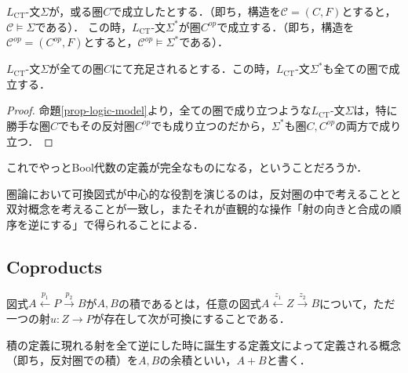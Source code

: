 \documentclass[uplatex, 12pt, dvipdfmx]{jsarticle}
\begin{document}
\begin{proposition*}\label{prop-logic-model}
    $L_{\mathrm{CT}}$-文$\Sigma$が，或る圏$C$で成立したとする．（即ち，構造を$\mathcal{C}=(C,F)$とすると，$\mathcal{C}\models\Sigma$である）．
    この時，$L_{\mathrm{CT}}$-文$\Sigma^*$が圏$C^{op}$で成立する．（即ち，構造を$\mathcal{C}^{op}=(C^{op},F)$とすると，$\mathcal{C}^{op}\models\Sigma^*$である）．
\end{proposition*}

\begin{proposition}\label{prop-duality-conceptual}
    $L_{\mathrm{CT}}$-文$\Sigma$が全ての圏$C$にて充足されるとする．この時，$L_{\mathrm{CT}}$-文$\Sigma^*$も全ての圏で成立する．
\end{proposition}
\begin{proof}
    命題\ref{prop-logic-model}より，全ての圏で成り立つような$L_{\mathrm{CT}}$-文$\Sigma$は，特に勝手な圏$C$でもその反対圏$C^{op}$でも成り立つのだから，$\Sigma^*$も圏$C,C^{op}$の両方で成り立つ．
\end{proof}

\begin{screen}
    これでやっとBool代数の定義が完全なものになる，ということだろうか．

    圏論において可換図式が中心的な役割を演じるのは，反対圏の中で考えることと双対概念を考えることが一致し，またそれが直観的な操作「射の向きと合成の順序を逆にする」で得られることによる．
\end{screen}

\subsection{Coproducts}

\begin{definition}[product]
    図式$A\xleftarrow{p_1}P\xrightarrow{p_2}B$が$A,B$の積であるとは，任意の図式$A\xleftarrow{z_1}Z\xrightarrow{z_2}B$について，ただ一つの射$u:Z\to P$が存在して次が可換にすることである．
    \begin{center}
    \end{center}
\end{definition}
\begin{definition*}
    積の定義に現れる射を全て逆にした時に誕生する定義文によって定義される概念（即ち，反対圏での積）を$A,B$の余積といい，$A+B$と書く．
\end{definition*}
\end{document}
